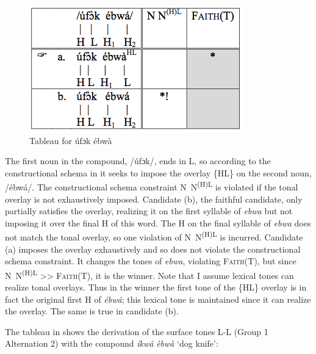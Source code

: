 \documentclass[output=paper]{langscibook}
\begin{document}
  
\begin{figure}
\includegraphics[width=\textwidth]{figures/glewwe-img2.png}
\caption{Tableau for \textup{úfɔk ébwà}}
\label{fig:glewwe:3}
\end{figure}

The first noun in the compound, /úfɔk/, ends in L, so according to the constructional schema in  it seeks to impose the overlay \{HL\} on the second noun, /ébwá/. The constructional schema constraint N~N\textsuperscript{(H)L} is violated if the tonal overlay is not exhaustively imposed. Candidate (b), the faithful candidate, only partially satisfies the overlay, realizing it on the first syllable of \textit{ebwa} but not imposing it over the final H of this word. The H on the final syllable of \textit{ebwa} does not match the tonal overlay, so one violation of N~N\textsuperscript{(H)L} is incurred. Candidate (a) imposes the overlay exhaustively and so does not violate the constructional schema constraint. It changes the tones of \textit{ebwa}, violating \textsc{Faith(T)}, but since N~N\textsuperscript{(H)L} >> \textsc{Faith(T)}, it is the winner. Note that I assume lexical tones can realize tonal overlays. Thus in the winner the first tone of the \{HL\} overlay is in fact the original first H of \textit{ébwá}; this lexical tone is maintained since it can realize the overlay. The same is true in candidate (b). 

The tableau in  shows the derivation of the surface tones L-L (Group 1 Alternation 2) with the compound \textit{íkwâ} \textit{èbwà} ‘dog knife’: 
\end{document}
